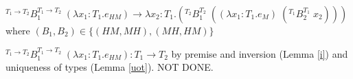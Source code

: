 \begin{case}
$^{T_{1}\rightarrow T_{2}}B_{1}^{T_{1}\rightarrow T_{2}}\;(\lambda x_{1}:T_{1}.e_{HM})\rightarrow\lambda x_{2}:T_{1}.(^{T_{2}}B_{1}^{T_{2}}\;((\lambda x_{1}:T_{1}.e_{M})\;(^{T_{1}}B_{2}^{T_{1}}\;x_{2})))$ where $(B_{1},B_{2})\in\lbrace(HM,MH),(MH,HM)\rbrace$

$^{T_{1}\rightarrow T_{2}}B_{1}^{T_{1}\rightarrow T_{2}}\;(\lambda x_{1}:T_{1}.e_{HM}):T_{1}\rightarrow T_{2}$ by premise and inversion (Lemma \ref{i}) and uniqueness of types (Lemma \ref{uot}).  NOT DONE.
\end{case}